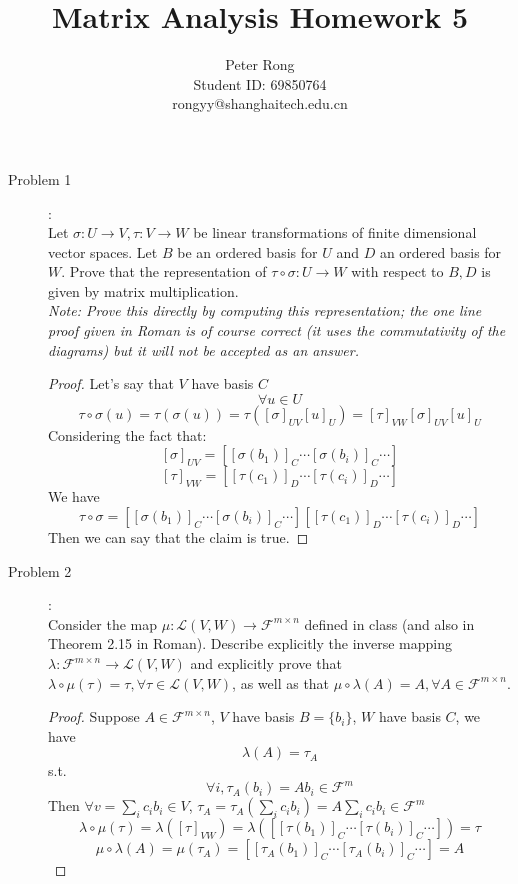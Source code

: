 \documentclass{article}
\title{Matrix Analysis Homework 5}
\author{Peter Rong \\ Student ID: 69850764 \\ rongyy@shanghaitech.edu.cn}
\begin{document}
\maketitle

\begin{description}

\item[Problem 1]:\\
Let $\sigma: U \rightarrow V, \tau: V\rightarrow W$ be linear transformations of finite dimensional vector spaces. Let $B$ be an ordered basis for $U$ and $D$ an ordered basis for $W$. Prove that the representation of $\tau\circ\sigma : U\rightarrow W$ with respect to $B, D$ is given by matrix multiplication. \\
\textit{Note: Prove this directly by computing this representation; the one line proof given in Roman is of course correct (it uses the commutativity of the diagrams) but it will not be accepted as an answer. }
\begin{proof}
	Let's say that $V$ have basis $C$
	$$\forall u \in U$$
	$$
		\tau\circ\sigma(u) = \tau(\sigma(u)) = \tau([\sigma]_{UV}[u]_U)=[\tau]_{VW}[\sigma]_{UV}[u]_U
	$$
	Considering the fact that:
	$$
		[\sigma]_{UV} = [[\sigma(b_1)]_C \cdots [\sigma(b_i)]_C \cdots]
	$$ $$
		[\tau]_{VW} = [[\tau(c_1)]_D \cdots [\tau(c_i)]_D \cdots]
	$$ 
	We have $$\tau\circ\sigma = [[\sigma(b_1)]_C \cdots [\sigma(b_i)]_C \cdots][[\tau(c_1)]_D \cdots [\tau(c_i)]_D \cdots]$$
	Then we can say that the claim is true.
\end{proof}


\item[Problem 2]:\\
Consider the map $\mu : \mathcal{L}(V, W)\rightarrow \mathcal{F}^{m\times n}$ defined in class (and also in Theorem 2.15 in Roman). Describe explicitly the inverse mapping $\lambda : \mathcal{F}^{m\times n}\rightarrow \mathcal{L}(V, W)$ and explicitly prove that $\lambda\circ\mu(\tau) = \tau, \forall\tau\in\mathcal{L}(V, W)$, as well as that $\mu\circ\lambda(A) = A, \forall A\in \mathcal{F}^{m\times n}$.
\begin{proof}
	Suppose $A \in \mathcal{F}^{m\times n}$, $V$ have basis $B = \{b_i\}$, $W$ have basis $C$, we have
	$$\lambda(A) = \tau_A$$
	s.t.
	$$\forall i, \tau_A(b_i) = Ab_i \in \mathcal{F}^m$$
	Then $\forall v = \sum_i c_ib_i \in V$, $\tau_A = \tau_A(\sum_i c_ib_i) = A\sum_i c_ib_i \in \mathcal{F}^m$ \\
	$$\lambda \circ \mu(\tau) = \lambda([\tau]_{VW}) = \lambda([[\tau(b_1)]_C \cdots [\tau(b_i)]_C \cdots]) = \tau$$
	$$\mu\circ\lambda(A) = \mu(\tau_A) = [[\tau_A(b_1)]_C \cdots [\tau_A(b_i)]_C \cdots] = A$$


\end{proof}
\end{description}
\end{document}

